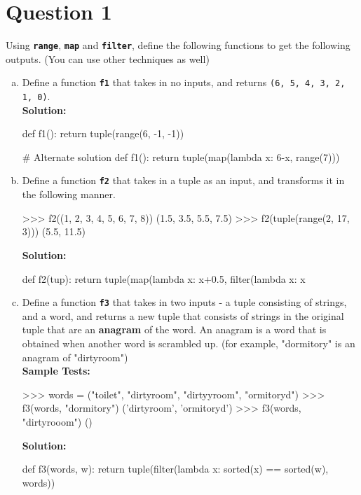 \section{Question 1}
Using \texttt{\bfseries range}, \texttt{\bfseries map} and \texttt{\bfseries filter}, define the
following functions to get the following outputs. (You can use other techniques as well)
\begin{enumerate}[(a)]
\item Define a function \texttt{\bfseries f1} that takes in no inputs, and returns \texttt{(6, 5, 4, 3, 2, 1, 0)}. \\
\textbf{Solution:}
\begin{python}
def f1():
    return tuple(range(6, -1, -1))

# Alternate solution
def f1():
    return tuple(map(lambda x: 6-x, range(7)))
\end{python}

\item Define a function \texttt{\bfseries f2} that takes in a tuple as an input, and transforms it in the following
manner.
\begin{python}
>>> f2((1, 2, 3, 4, 5, 6, 7, 8))
(1.5, 3.5, 5.5, 7.5)
>>> f2(tuple(range(2, 17, 3)))
(5.5, 11.5)
\end{python}
\textbf{Solution:}
\begin{python}
def f2(tup):
    return tuple(map(lambda x: x+0.5, filter(lambda x: x%
\end{python}

\item Define a function \texttt{\bfseries f3} that takes in two inputs - a tuple consisting of strings, and a word,
and returns a new tuple that consists of strings in the original tuple that are an \textbf{anagram} of the
word. An anagram is a word that is obtained when another word is scrambled up. (for example, "dormitory" is an
anagram of "dirtyroom") \\
\textbf{Sample Tests:}
\begin{python}
>>> words = ("toilet", "dirtyroom", "dirtyyroom", "ormitoryd")
>>> f3(words, "dormitory")
('dirtyroom', 'ormitoryd')
>>> f3(words, "dirtyrooom")
()
\end{python}
\textbf{Solution:}
\begin{python}
def f3(words, w):
    return tuple(filter(lambda x: sorted(x) == sorted(w), words))
\end{python}
\end{enumerate}

